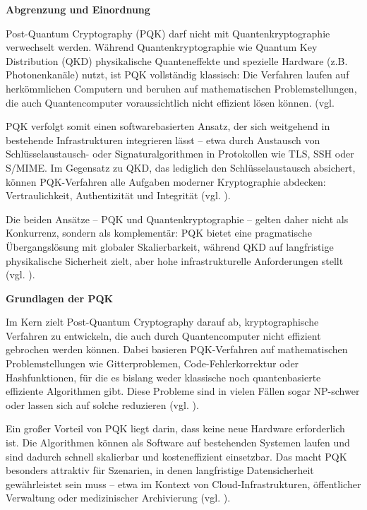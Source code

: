 \vspace{1em}
\textbf{Abgrenzung und Einordnung}


Post-Quantum Cryptography (PQK) darf nicht mit Quantenkryptographie verwechselt werden. Während Quantenkryptographie wie Quantum Key Distribution (QKD) physikalische Quanteneffekte und spezielle Hardware (z.B. Photonenkanäle) nutzt, ist PQK vollständig klassisch: Die Verfahren laufen auf herkömmlichen Computern und beruhen auf mathematischen Problemstellungen, die auch Quantencomputer voraussichtlich nicht effizient lösen können. (vgl. \cite{chen_l_et_al_report_2016, mosca_et_al_cybersecurity_2018}


PQK verfolgt somit einen softwarebasierten Ansatz, der sich weitgehend in bestehende Infrastrukturen integrieren lässt – etwa durch Austausch von Schlüsselaustausch- oder Signaturalgorithmen in Protokollen wie TLS, SSH oder S/MIME. Im Gegensatz zu QKD, das lediglich den Schlüsselaustausch absichert, können PQK-Verfahren alle Aufgaben moderner Kryptographie abdecken: Vertraulichkeit, Authentizität und Integrität (vgl. \cite{bernstein_et_al_post-quantum_2009, chen_l_et_al_report_2016, national_academies_of_sciences_quantum_2019}).


Die beiden Ansätze – PQK und Quantenkryptographie – gelten daher nicht als Konkurrenz, sondern als komplementär: PQK bietet eine pragmatische Übergangslösung mit globaler Skalierbarkeit, während QKD auf langfristige physikalische Sicherheit zielt, aber hohe  infrastrukturelle Anforderungen stellt (vgl. \cite{mosca_et_al_cybersecurity_2018}).


\vspace{1em}
\textbf{Grundlagen der PQK}


Im Kern zielt Post-Quantum Cryptography darauf ab, kryptographische Verfahren zu entwickeln, die auch durch Quantencomputer nicht effizient gebrochen werden können. Dabei basieren PQK-Verfahren auf mathematischen Problemstellungen wie Gitterproblemen, Code-Fehlerkorrektur oder Hashfunktionen, für die es bislang weder klassische noch quantenbasierte effiziente Algorithmen gibt. Diese Probleme sind in vielen Fällen sogar NP-schwer oder lassen sich auf solche reduzieren (vgl. \cite{chen_l_et_al_report_2016, bernstein_et_al_post-quantum_2009}).


Ein großer Vorteil von PQK liegt darin, dass keine neue Hardware erforderlich ist. Die Algorithmen können als Software auf bestehenden Systemen laufen und sind dadurch schnell skalierbar und kosteneffizient einsetzbar. Das macht PQK besonders attraktiv für Szenarien, in denen langfristige Datensicherheit gewährleistet sein muss – etwa im Kontext von Cloud-Infrastrukturen, öffentlicher Verwaltung oder medizinischer Archivierung (vgl. \cite{mosca_et_al_cybersecurity_2018, national_academies_of_sciences_quantum_2019}).



